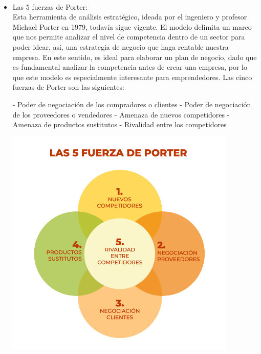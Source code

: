 	\\
\begin{itemize}
\item Las 5 fuerzas de Porter:
\\Esta herramienta de análisis estratégico, ideada por el ingeniero y profesor Michael Porter en 1979, todavía sigue vigente. El modelo delimita un marco que nos permite analizar el nivel de competencia dentro de un sector para poder idear, así, una estrategia de negocio que haga rentable nuestra empresa. En este sentido, es ideal para elaborar un plan de negocio, dado que es fundamental analizar la competencia antes de crear una empresa, por lo que este modelo es especialmente interesante para emprendedores. Las cinco fuerzas de Porter son las siguientes:

- Poder de negociación de los compradores o clientes
- Poder de negociación de los proveedores o vendedores
- Amenaza de nuevos competidores
- Amenaza de productos sustitutos
- Rivalidad entre los competidores
		\begin{center}
		\includegraphics[width=11cm]{./Imagenes/Imagen5}
		\end{center}

	\end{itemize} 
	
